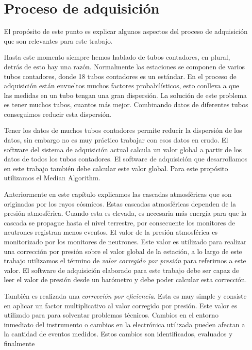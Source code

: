 \section{Proceso de adquisición}
	El propósito de este punto es explicar algunos aspectos del proceso de adquisición que son relevantes para este trabajo.
	\par
	Hasta este momento siempre hemos hablado de tubos contadores, en plural, detrás de esto hay una razón. Normalmente las estaciones se componen
	de varios tubos contadores, donde 18 tubos contadores es un estándar. En el proceso de adquisición están envueltos muchos factores
	probabilísticos, esto conlleva a que las medidas en un tubo tengan una gran dispersión. La solución de este problema es tener muchos tubos,
	cuantos más mejor. Combinando datos de diferentes tubos conseguimos reducir esta dispersión. 
	\par
	Tener los datos de muchos tubos contadores permite reducir la dispersión de los datos, sin embargo no es muy práctico trabajar con esos datos
	en crudo. El software del sistema de adquisición actual calcula un valor global a partir de los datos de todos los tubos contadores. El
	software de adquisición que desarrollamos en este trabajo también debe calcular este valor global.  Para este propósito utilizamos el Median
	Algorithm\cite{MedianAlgr}.
	\par
	Anteriormente en este capítulo explicamos las cascadas atmosféricas que son originadas por los rayos cósmicos. Estas cascadas atmosféricas
	dependen de la presión atmosférica. Cuando esta es elevada, es necesaria más energía para que la cascada se propague hasta el nivel terrestre,
	por consecuente los monitores de neutrones registran menos eventos. El valor de la presión atmosférica es monitorizado por los monitores de
	neutrones. Este valor es utilizado para realizar una corrección por presión sobre el valor global de la estación, a lo largo de este trabajo
	utilizamos el término de \emph{valor corregido por presión} para referirnos a este valor. El software de adquisición elaborado para este
	trabajo debe ser capaz de leer el valor de presión desde un barómetro y debe poder calcular esta corrección. 
	\par
	También es realizada una \emph{corrección por eficiencia}. Esta es muy simple y consiste en aplicar un factor multiplicativo al valor
	corregido por presión. Este valor es utilizado para para solventar problemas técnicos. Cambios en el entorno inmediato del instrumento o
	cambios en la electrónica utilizada pueden afectan a la cantidad de eventos medidos. Estos cambios son identificados, evaluados y finalmente
